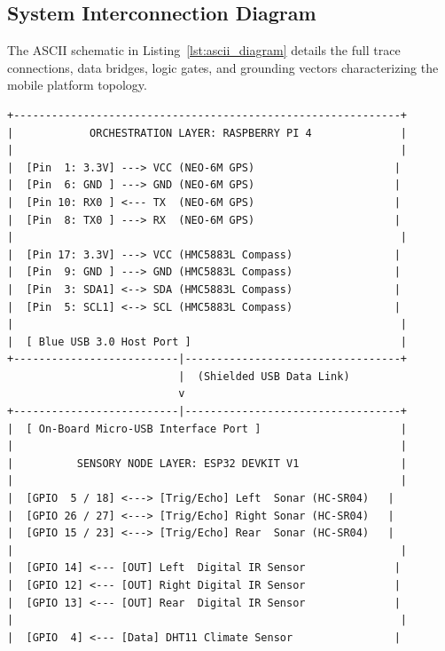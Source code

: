 \documentclass[conference]{IEEEtran}
\begin{document}
\subsection{System Interconnection Diagram}
The ASCII schematic in Listing~\ref{lst:ascii_diagram} details the full trace connections, data bridges, logic gates, and grounding vectors characterizing the mobile platform topology.

\begin{lstlisting}[caption={Vertical System Interconnection Diagram}, label={lst:ascii_diagram}, basicstyle=\ttfamily\fontsize{5.5}{6.5}\selectfont, numbers=none]
+-------------------------------------------------------------+
|            ORCHESTRATION LAYER: RASPBERRY PI 4              |
|                                                             |
|  [Pin  1: 3.3V] ---> VCC (NEO-6M GPS)                      |
|  [Pin  6: GND ] ---> GND (NEO-6M GPS)                      |
|  [Pin 10: RX0 ] <--- TX  (NEO-6M GPS)                      |
|  [Pin  8: TX0 ] ---> RX  (NEO-6M GPS)                      |
|                                                             |
|  [Pin 17: 3.3V] ---> VCC (HMC5883L Compass)                |
|  [Pin  9: GND ] ---> GND (HMC5883L Compass)                |
|  [Pin  3: SDA1] <--> SDA (HMC5883L Compass)                |
|  [Pin  5: SCL1] <--> SCL (HMC5883L Compass)                |
|                                                             |
|  [ Blue USB 3.0 Host Port ]                                 |
+--------------------------|----------------------------------+
                           |  (Shielded USB Data Link)
                           v
+--------------------------|----------------------------------+
|  [ On-Board Micro-USB Interface Port ]                      |
|                                                             |
|          SENSORY NODE LAYER: ESP32 DEVKIT V1                |
|                                                             |
|  [GPIO  5 / 18] <---> [Trig/Echo] Left  Sonar (HC-SR04)   |
|  [GPIO 26 / 27] <---> [Trig/Echo] Right Sonar (HC-SR04)   |
|  [GPIO 15 / 23] <---> [Trig/Echo] Rear  Sonar (HC-SR04)   |
|                                                             |
|  [GPIO 14] <--- [OUT] Left  Digital IR Sensor              |
|  [GPIO 12] <--- [OUT] Right Digital IR Sensor              |
|  [GPIO 13] <--- [OUT] Rear  Digital IR Sensor              |
|                                                             |
|  [GPIO  4] <--- [Data] DHT11 Climate Sensor                |

\end{lstlisting}
\end{document}
